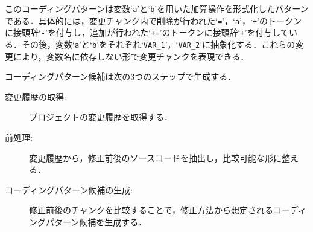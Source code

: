 \documentclass[11pt]{jreport}
\begin{document}
このコーディングパターンは変数`\texttt{a}'と`\texttt{b}'を用いた加算操作を形式化したパターンである．具体的には，変更チャンク内で削除が行われた`\texttt{=}'，`\texttt{a}'，`\texttt{+}'のトークンに接頭辞`\texttt{-}'を付与し，追加が行われた`\texttt{+=}'のトークンに接頭辞`\texttt{+}'を付与している．その後，変数`\texttt{a}'と`\texttt{b}'をそれぞれ`\texttt{VAR\_1}'，`\texttt{VAR\_2}'に抽象化する．これらの変更により，変数名に依存しない形で変更チャンクを表現できる．

コーディングパターン候補は次の3つのステップで生成する．
\begin{description}
    \item[変更履歴の取得: ] プロジェクトの変更履歴を取得する．
    \item[前処理: ] 変更履歴から，修正前後のソースコードを抽出し，比較可能な形に整える． 
    \item[コーディングパターン候補の生成: ] 修正前後のチャンクを比較することで，修正方法から想定されるコーディングパターン候補を生成する．
\end{description}



\end{document}
